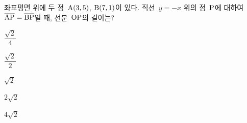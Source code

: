 좌표평면 위에 두 점~$\mathrm{A}(3{,}\mkern3mu 5)$, $\mathrm{B}(7{,}\mkern3mu 1)$이 있다. 직선~$y=-x$ 위의 점~$\mathrm{P}$에 대하여 $\overline{\mathrm{AP}}=\overline{\mathrm{BP}}$일 때, 선분~$\mathrm{OP}$의 길이는? 
\begin{choices32}{\rule[-3ex]{0pt}{8ex}$\dfrac{\sqrt{2}}{4}$}{\rule[-3ex]{0pt}{8ex}$\dfrac{\sqrt{2}}{2}$}{\rule[-3ex]{0pt}{8ex}$\sqrt{2}$}{\rule[-3ex]{0pt}{8ex}$2\sqrt{2}$}{\rule[-3ex]{0pt}{8ex}$4\sqrt{2}$}\end{choices32}

